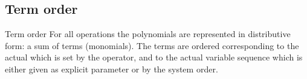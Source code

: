 \subsection{Term order}
\begin{Introduction}{Term order}
For all  operations the polynomials are 
represented in distributive form: a sum of terms (monomials).
The terms are ordered corresponding to the actual 
which is set by the  operator, and to the
actual variable sequence which is either given as explicit
parameter or by the system  order. 
\end{Introduction}


